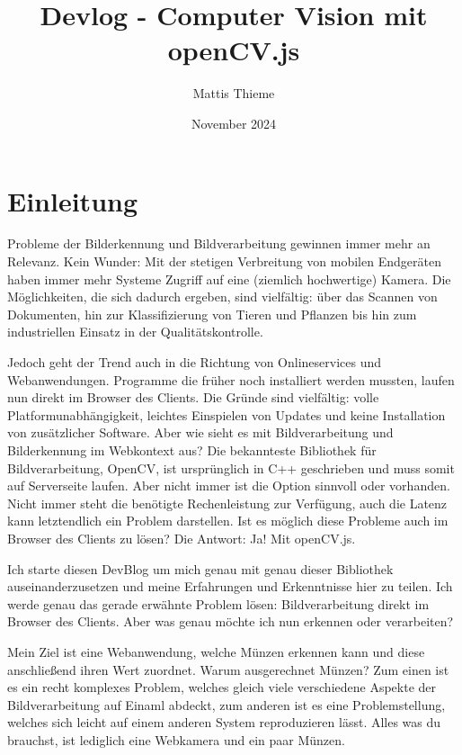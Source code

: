 \documentclass{article}
\title{Devlog - Computer Vision mit openCV.js}
\author{Mattis Thieme}
\date{November 2024}
\begin{document}
\maketitle \newpage

\renewcommand*\contentsname{Inhaltsverzeichnis} %
\tableofcontents \newpage

\section{Einleitung}

Probleme der Bilderkennung und Bildverarbeitung gewinnen immer mehr an Relevanz. Kein Wunder: Mit der stetigen Verbreitung von mobilen Endgeräten haben immer mehr Systeme Zugriff auf eine (ziemlich hochwertige) Kamera. Die Möglichkeiten, die sich dadurch ergeben, sind vielfältig: über das Scannen von Dokumenten, hin zur Klassifizierung von Tieren und Pflanzen bis hin zum industriellen Einsatz in der Qualitätskontrolle.

Jedoch geht der Trend auch in die Richtung von Onlineservices und Webanwendungen. Programme die früher noch installiert werden mussten, laufen nun direkt im Browser des Clients. Die Gründe sind vielfältig: volle Platformunabhängigkeit, leichtes Einspielen von Updates und keine Installation von zusätzlicher Software. Aber wie sieht es mit Bildverarbeitung und Bilderkennung im Webkontext aus? Die bekannteste Bibliothek für Bildverarbeitung, OpenCV, ist ursprünglich in C++ geschrieben und muss somit auf Serverseite laufen. Aber nicht immer ist die Option sinnvoll oder vorhanden. Nicht immer steht die benötigte Rechenleistung zur Verfügung, auch die Latenz kann letztendlich ein Problem darstellen. Ist es möglich diese Probleme auch im Browser des Clients zu lösen? Die Antwort: Ja! Mit openCV.js.

Ich starte diesen DevBlog um mich genau mit genau dieser Bibliothek auseinanderzusetzen und meine Erfahrungen und Erkenntnisse hier zu teilen. Ich werde genau das gerade erwähnte Problem lösen: Bildverarbeitung direkt im Browser des Clients. Aber was genau möchte ich nun erkennen oder verarbeiten? 

Mein Ziel ist eine Webanwendung, welche Münzen erkennen kann und diese anschließend ihren Wert zuordnet. Warum ausgerechnet Münzen? Zum einen ist es ein recht komplexes Problem, welches gleich viele verschiedene Aspekte der Bildverarbeitung auf Einaml abdeckt, zum anderen ist es eine Problemstellung, welches sich leicht auf einem anderen System reproduzieren lässt. Alles was du brauchst, ist lediglich eine Webkamera und ein paar Münzen. 
\end{document}
